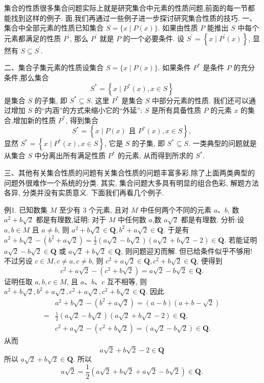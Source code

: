 
集合的性质很多集合问题实际上就是研究集合中元素的性质问题,前面的每一节都能找到这样的例子.
面,我们再通过一些例子进一步探讨研究集合性质的技巧.
一、集合中全部元素的性质已知集合 $S=\{x \mid P(x)\}$. 如果由性质 $P$ 能推出 $S$ 中每个元素都满足的性质 $P^{\prime}$, 那么 $P^{\prime}$ 就是 $P$ 的一个必要条件.
设 $S^{\prime}=\left\{x \mid P^{\prime}(x)\right\}$, 显然有 $S \subseteq S^{\prime}$.



二、集合子集元素的性质设集合 $S=\{x \mid P(x)\}$. 如果条件 $P^*$ 是条件 $P$ 的充分条件,那么集合
$$
S^*=\left\{x \mid P^*(x), x \in S\right\}
$$
是集合 $S$ 的子集, 即 $S^* \subseteq S$. 这里 $P^*$ 是集合 $S$ 中部分元素的性质.
我们还可以通过增加 $S$ 的“内涵”的方式来缩小它的“外延”: $S$ 是所有具备性质 $P$ 的元素 $x$ 的集合,增加新的性质 $P^*$, 得到集合
$$
S^*=\left\{x \mid P(x) \text { 且 } P^*(x), x \in S\right\},
$$
显然 $S^*=\left\{x \mid P^*(x), x \in S\right\}$, 它是 $S$ 的子集, 即 $S^* \subseteq S$.
一类典型的问题就是从集合 $S$ 中分离出所有满足性质 $P^*$ 的元素, 从而得到所求的 $S^*$.



三、其他有关集合性质的问题有关集合性质的问题丰富多彩,除了上面两类典型的问题外很难作一个系统的分类.
其实, 集合问题大多具有明显的组合色彩, 解题方法各异, 分类并没有实质意义.
下面我们再看几个例子.



例1. 已知数集 $M$ 至少有 3 个元素, 且对 $M$ 中任何两个不同的元素 $a 、 b$, 数 $a^2+b \sqrt{2}$ 都是有理数,证明: 对于 $M$ 中任何数 $a$,数 $a \sqrt{2}$ 都是有理数.
分析:设 $a, b \in M$ 且 $a \neq b$, 则 $a^2+b \sqrt{2} \in \mathbf{Q}, b^2+a \sqrt{2} \in \mathbf{Q}$. 于是有 $a^2+ b \sqrt{2}-\left(b^2+a \sqrt{2}\right)=\frac{1}{2}(a \sqrt{2}-b \sqrt{2})(a \sqrt{2}+b \sqrt{2}-2) \in \mathbf{Q}$. 若能证明 $a \sqrt{2}- b \sqrt{2} \in \mathbf{Q}$ 或 $a \sqrt{2}+b \sqrt{2} \in \mathbf{Q}$, 则问题迎刃而解.
但已给条件似乎不够用! 不过另设 $c \in M, c \neq a, c \neq b$, 则 $c^2+a \sqrt{2} \in \mathbf{Q}, c^2+b \sqrt{2} \in \mathbf{Q}$, 便得到
$$
c^2+a \sqrt{2}-\left(c^2+b \sqrt{2}\right)=a \sqrt{2}-b \sqrt{2} \in \mathbf{Q} .
$$
证明任取 $a, b, c \in M$, 且 $a 、 b 、 c$ 互不相等, 则 $a^2+b \sqrt{2}, b^2+a \sqrt{2}, c^2+ a \sqrt{2}, c^2+b \sqrt{2} \in \mathbf{Q}$. 因此
$$
\begin{aligned}
& a^2+b \sqrt{2}-\left(b^2+a \sqrt{2}\right)=(a-b)(a+b-\sqrt{2}) \\
= & \frac{1}{2}(a \sqrt{2}-b \sqrt{2})(a \sqrt{2}+b \sqrt{2}-2) \in \mathbf{Q}, \\
& c^2+a \sqrt{2}-\left(c^2+b \sqrt{2}\right)=(a \sqrt{2}-b \sqrt{2}) \in \mathbf{Q} .
\end{aligned}
$$
从而
$$
a \sqrt{2}+b \sqrt{2}-2 \in \mathbf{Q}
$$
所以 $a \sqrt{2}+b \sqrt{2} \in \mathbf{Q}$.
所以
$$
a \sqrt{2}=\frac{1}{2}(a \sqrt{2}+b \sqrt{2}+a \sqrt{2}-b \sqrt{2}) \in \mathbf{Q} .
$$



